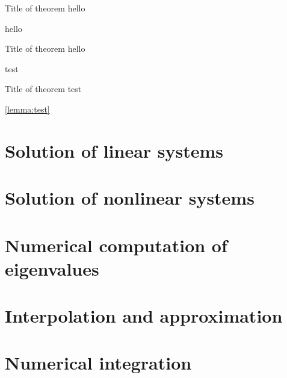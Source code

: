 \documentclass[a4paper]{report}
\begin{document}
\begin{theorem}
    {Title of theorem}
    \label{thm:test}
    hello
\end{theorem}

\begin{example}
    hello
\end{example}

\begin{lemma}
    {Title of theorem}
    \label{lemma:test}
    hello
\end{lemma}

\begin{remark}
    [Hello]
    test
\end{remark}

\begin{theorem}
    {Title of theorem}
    test
\end{theorem}

\cref{lemma:test}

\chapter{Solution of linear systems}
\label{cha:solution_of_linear_systems}

\chapter{Solution of nonlinear systems}
\label{cha:solution_of_nonlinear_systems}

\chapter{Numerical computation of eigenvalues}%
\label{cha:numerical_computation_of_eigenvalues}

\chapter{Interpolation and approximation}%
\label{cha:interpolation_and_approximation}

\chapter{Numerical integration}
\label{cha:quadrature}

\nocite{*}
\printbibliography
\end{document}
